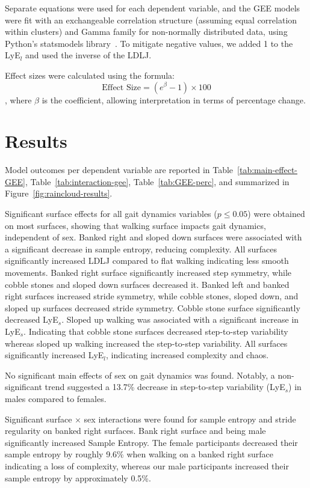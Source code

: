 \documentclass[authoryear,preprint,review,12pt]{elsarticle}
\begin{document}
Separate equations were used for each dependent variable, and the GEE models were fit with an exchangeable correlation structure (assuming equal correlation within clusters) and Gamma family for non-normally distributed data, using Python's statsmodels library~\citep{seabold2010statsmodels}. To mitigate negative values, we added 1 to the LyE$_{l}$ and used the inverse of the LDLJ. 

Effect sizes were calculated using the formula: 
\begin{equation}
    \text{Effect Size} = (e^{\beta} - 1) \times 100
\end{equation}
, where $\beta$ is the coefficient, allowing interpretation in terms of percentage change. 


\section{Results}
\label{results}
Model outcomes per dependent variable are reported in Table~\ref{tab:main-effect-GEE}, Table~\ref{tab:interaction-gee}, Table~\ref{tab:GEE-perc}, and summarized in Figure~\ref{fig:raincloud-results}.

Significant surface effects for all gait dynamics variables ($p \leq 0.05$) were obtained on most surfaces, showing that walking surface impacts gait dynamics, independent of sex.
Banked right and sloped down surfaces were associated with a significant decrease in sample entropy, reducing complexity. All surfaces significantly increased LDLJ compared to flat walking indicating less smooth movements. Banked right surface significantly increased step symmetry, while cobble stones and sloped down surfaces decreased it. Banked left and banked right surfaces increased stride symmetry, while cobble stones, sloped down, and sloped up surfaces decreased stride symmetry. Cobble stone surface significantly decreased LyE$_{s}$. Sloped up walking was associated with a significant increase in LyE$_{s}$. Indicating that cobble stone surfaces decreased step-to-step variability whereas sloped up walking increased the step-to-step variability. All surfaces significantly increased LyE${_l}$, indicating increased complexity and chaos.

No significant main effects of sex on gait dynamics was found. Notably, a non-significant trend suggested a 13.7\% decrease in step-to-step variability (LyE${_s}$) in males compared to females.

Significant surface $\times$ sex interactions were found for sample entropy and stride regularity on banked right surfaces. 
Bank right surface and being male significantly increased Sample Entropy. The female participants decreased their sample entropy by roughly 9.6\% when walking on a banked right surface indicating a loss of complexity, whereas our male participants increased their sample entropy by approximately 0.5\%. 
\end{document}
